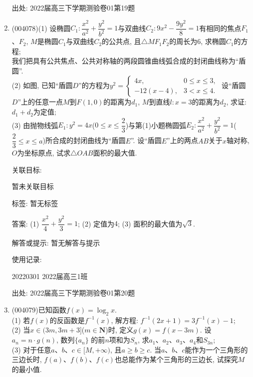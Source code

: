 \documentclass[10pt,a4paper]{article}
\begin{document}
\begin{enumerate}[1.]
出处: 2022届高三下学期测验卷01第19题
\item { (004078)}(1) 设椭圆$C_1:\dfrac{x^2}{a^2}+\dfrac{y^2}{b^2}=1$与双曲线$C_2:9{x^2}-\dfrac{9y^2}8=1$有相同的焦点$F_1$、$F_2$, $M$是椭圆$C_1$与双曲线$C_2$的公共点, 且$\triangle MF_1F_2$的周长为$6$, 求椭圆$C_1$的方程;\\
我们把具有公共焦点、公共对称轴的两段圆锥曲线弧合成的封闭曲线称为``盾圆''.\\
(2) 如图, 已知``盾圆$D$''的方程为$y^2=\begin{cases}
4x, &  0\le x\le 3,\\ -12(x-4), & 3<x\le 4.  \end{cases}$ 设``盾圆$D$''上的任意一点$M$到$F(1,0)$的距离为$d_1$, $M$到直线$l:x=3$的距离为$d_2$, 求证: $d_1+d_2$为定值;\\
(3) 由抛物线弧$E_1:y^2=4x$($0\le x\le \dfrac 23$)与第(1)小题椭圆弧$E_2:\dfrac{x^2}{a^2}+\dfrac{y^2}{b^2}=1$($\dfrac 23\le x\le a$)所合成的封闭曲线为``盾圆$E$''. 设``盾圆$E$''上的两点$AB$关于$x$轴对称, $O$为坐标原点, 试求$\triangle OAB$面积的最大值.
\begin{center}
\end{center}


关联目标:

暂未关联目标



标签: 暂无标签

答案: (1) $\dfrac{x^2}4+\dfrac{y^2}3=1$; (2) 定值为$4$; (3) 面积的最大值为$\sqrt{3}$.

解答或提示: 暂无解答与提示

使用记录:

20220301	2022届高三1班			


出处: 2022届高三下学期测验卷01第20题
\item { (004079)}已知函数$f(x)=\log_2x$.\\
(1) 若$f(x)$的反函数是$f^{-1}(x)$, 解方程: $f^{-1}(2x+1)=3f^{-1}(x)-1$;\\
(2) 当$x\in (3m, 3m+3]$($m\in \mathbf{N}$)时, 定义$g(x)=f(x-3m)$. 设$a_n=n\cdot g(n)$, 数列$\{a_n\}$ 的前$n$项和为$S_n$, 求$a_1$、$a_2$、$a_3$、$a_4$和$S_{3n}$;\\
(3) 对于任意$a$、$b$、$c\in [M,+\infty)$, 且$a\ge b\ge c$. 当$a$、$b$、$c$能作为一个三角形的三边长时, $f(a)$、$f(b)$、$f(c)$也总能作为某个三角形的三边长, 试探究$M$的最小值.



\end{enumerate}
\end{document}
